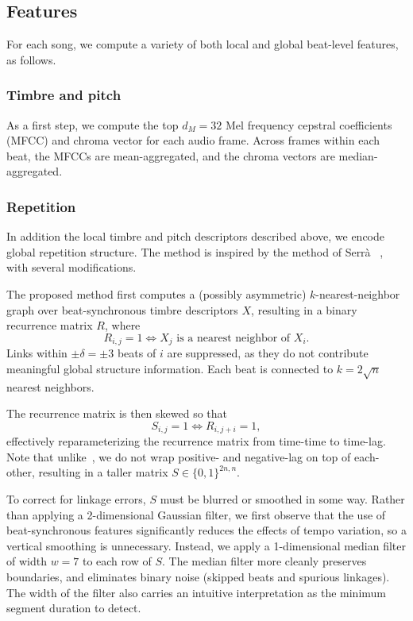 \documentclass{article}
\begin{document}
\subsection{Features}

For each song, we compute a variety of both local and global beat-level features, as follows.

\subsubsection{Timbre and pitch}
As a first step, we compute the top $d_M=32$ Mel frequency cepstral coefficients (MFCC) and chroma vector for each 
audio frame.  Across frames within each beat, the MFCCs are mean-aggregated, and the chroma vectors are 
median-aggregated.


\subsubsection{Repetition}
In addition the local timbre and pitch descriptors described above, we encode global repetition structure.  The
method is inspired by the method of Serr\`{a} \etal~\cite{serra2012unsupervised}, with several modifications.

The proposed method first computes a (possibly asymmetric) $k$-nearest-neighbor graph over beat-synchronous timbre 
descriptors $X$, resulting in a binary recurrence matrix $R$, where
\[
R_{i,j} = 1 \Leftrightarrow X_j \text{ is a nearest neighbor of } X_i.
\]
Links within $\pm\delta=\pm3$ beats of $i$ are suppressed, as they do not contribute meaningful global structure
information.  Each beat is connected to $k=2\sqrt{n}$ nearest neighbors.

The recurrence matrix is then skewed so that
\[
S_{i,j} = 1 \Leftrightarrow R_{i, j+i} = 1,
\]
effectively reparameterizing the recurrence matrix from time-time to time-lag.  Note that
unlike~\cite{serra2012unsupervised}, we do not wrap positive- and negative-lag on top of each-other, resulting
in a taller matrix $S \in \{0,1\}^{2n, n}$.

To correct for linkage errors, $S$ must be blurred or smoothed in some way.  Rather than applying a
2-dimensional Gaussian filter, we first observe that the use of beat-synchronous features significantly 
reduces the effects of tempo variation, so a vertical smoothing is unnecessary.  Instead, we apply a
1-dimensional median filter of width $w=7$ to each row of $S$.  The median filter more cleanly preserves
boundaries, and eliminates binary noise (skipped beats and spurious linkages).  The width of the filter also
carries an intuitive interpretation as the minimum segment duration to detect.
\end{document}
